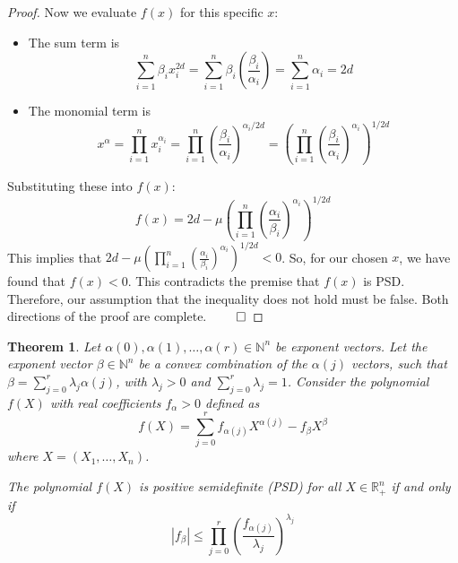 \documentclass{article}
\newtheorem{theorem}{Theorem}
\begin{document}
\begin{proof}
Now we evaluate $f(x)$ for this specific $x$:
\begin{itemize}
   \item The sum term is
   \[
      \sum_{i=1}^n \beta_i x_i^{2d} = \sum_{i=1}^n \beta_i \left( \frac{\beta_i}{\alpha_i} \right) = \sum_{i=1}^n \alpha_i = 2d
   \]
   \item The monomial term is
   \[
      x^{\alpha} = \prod_{i=1}^n x_i^{\alpha_i} = \prod_{i=1}^n \left( \frac{\beta_i}{\alpha_i} \right)^{\alpha_i/2d} = \left( \prod_{i=1}^n \left( \frac{\beta_i}{\alpha_i} \right)^{\alpha_i} \right)^{1/2d}
   \]
\end{itemize}
Substituting these into $f(x)$:
\[
   f(x) = 2d - \mu \left( \prod_{i=1}^n \left( \frac{\alpha_i}{\beta_i} \right)^{\alpha_i} \right)^{1/2d}
\]
This implies that $2d - \mu \left( \prod_{i=1}^n \left( \frac{\alpha_i}{\beta_i} \right)^{\alpha_i} \right)^{1/2d} < 0$.
So, for our chosen $x$, we have found that $f(x) < 0$. This contradicts the premise that $f(x)$ is PSD. Therefore,
our assumption that the inequality does not hold must be false.
Both directions of the proof are complete. $\qed$
\end{proof}

\begin{theorem}
Let $\alpha(0), \alpha(1), \dots, \alpha(r) \in \mathbb{N}^n$ be exponent vectors. Let the exponent vector
$\beta \in \mathbb{N}^n$ be a convex combination of the $\alpha(j)$ vectors, such that $\beta = \sum_{j=0}^r \lambda_j \alpha(j)$,
with $\lambda_j > 0$ and $\sum_{j=0}^r \lambda_j = 1$. Consider the polynomial $f(X)$ with real coefficients $f_{\alpha} > 0$
defined as
\[
   f(X) = \sum_{j=0}^r f_{\alpha(j)} X^{\alpha(j)} - f_{\beta} X^{\beta}
\]
where $X = (X_1, \dots, X_n)$.

The polynomial $f(X)$ is positive semidefinite (PSD) for all $X \in \mathbb{R}_+^n$ if and only if
\[
   |f_{\beta}| \leq \prod_{j=0}^r \left( \frac{f_{\alpha(j)}}{\lambda_j} \right)^{\lambda_j}
\]
\end{theorem}
\end{document}
